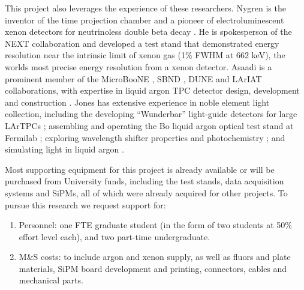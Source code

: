 This project also leverages the experience of these researchers.  Nygren is the inventor of the time projection chamber \cite{Nygren:1976fe} and a pioneer of electroluminescent xenon detectors for neutrinoless double beta decay \cite{Gonzalez-Diaz:2015oba,Mart,Nygren:2009zz,Goldschmidt:2011ria,Nygren:2007zzc,Sinclair:2011zz}.  He is spokesperson of the NEXT collaboration and developed a test stand that demonstrated energy resolution near the intrinsic limit of xenon gas \cite{Alvarez:2012yxw} (1\% FWHM at 662 keV), the worlds most precise energy resolution from a xenon detector. Asaadi is a prominent member of the MicroBooNE \cite{Chen:2007ae}, SBND \cite{Antonello:2015lea}, DUNE \cite{Acciarri:2015uup} and LArIAT \cite{Cavanna:2014iqa} collaborations, with expertise in liquid argon TPC detector design, development and construction \cite{Asaadi:2014iva}.  Jones has extensive experience in noble element light collection,  including the developing ``Wunderbar'' light-guide detectors for large LArTPCs \cite{Jones:2013sfa,Baptista:2012bf,Moss:2014ota}; assembling and operating the Bo liquid argon optical test stand at Fermilab \cite{Jones:2013bca,Jones:2013mfa,Jones:2013nea}; exploring wavelength shifter properties and photochemistry \cite{Jones:2012hm}; and simulating light in liquid argon \cite{uBOpticalSim,Jones:2013sfa}.

Most supporting equipment for this project is already available or will be purchased from University funds, including the test stands, data acquisition systems and SiPMs, all of which were already acquired for other projects.  To pursue this research we request support for: 

\begin{enumerate}
\item  Personnel: one FTE graduate student (in the form of two students at 50\% effort level each), and two part-time undergraduate.
\item  M\&S costs: to include argon and xenon supply, as well as fluors and plate materials, SiPM board development and printing, connectors, cables and mechanical parts.
\end{enumerate}




